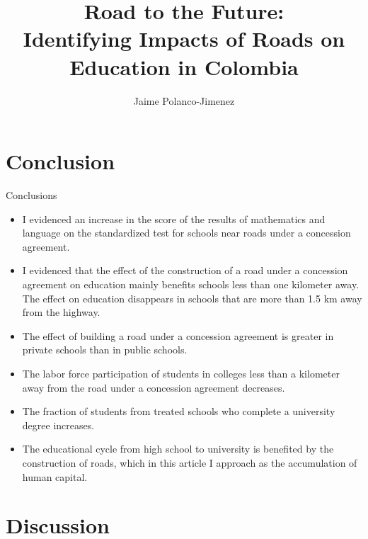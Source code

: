 \documentclass[9pt]{beamer}
\begin{document}
\section{Conclusion}


\begin{frame}{Conclusions}
\begin{itemize}
     \item I evidenced an increase in the score of the results of mathematics and language on the standardized test for schools near roads under a concession agreement.
    
    \item I evidenced that the effect of the construction of a road under a concession agreement on education mainly benefits schools less than one kilometer away. The effect on education disappears in schools that are more than 1.5 km away from the highway.

    \item The effect of building a road under a concession agreement is greater in private schools than in public schools.

    \item The labor force participation of students in colleges less than a kilometer away from the road under a concession agreement decreases.
    
    \item The fraction of students from treated schools who complete a university degree increases. 
    
    \item The educational cycle from high school to university is benefited by the construction of roads, which in this article I approach as the accumulation of human capital.
    
\end{itemize}

\end{frame}

\section{Discussion}


\begin{frame}
  \title[PhD in Economic Sciences]{Road to the Future: \\ Identifying Impacts of Roads on Education in Colombia}
  \author[IEA World Congress 2023]{Jaime Polanco-Jimenez}
  \titlepage
\end{frame}
\end{document}
